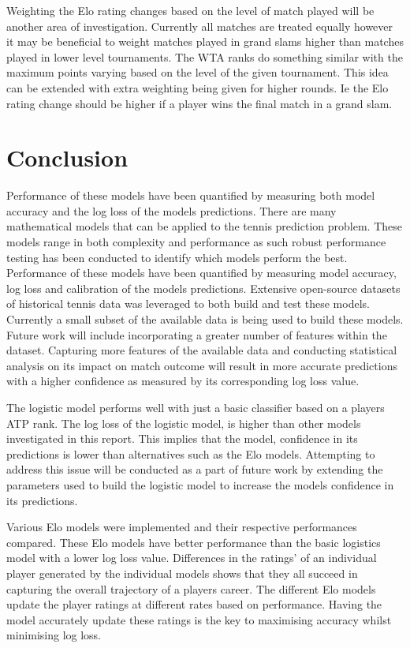 \documentclass[12pt,a4paper]{article}
\begin{document}
Weighting the Elo rating changes based on the level of match played will be another area of
investigation. Currently all matches are treated equally however it may be beneficial to weight
matches played in grand slams higher than matches played in lower level tournaments. The WTA ranks
do something similar with the maximum points varying based on the level of the given tournament.
This idea can be extended with extra weighting being given for higher rounds. Ie the Elo rating
change should be higher if a player wins the final match in a grand slam.
\clearpage

\section{Conclusion}
Performance of these models have been quantified by measuring both
model accuracy and the log loss of the models predictions. There are many mathematical models that can be applied to the tennis prediction problem.
These models range in both complexity and performance as such robust performance testing
has been conducted to identify which models perform the best. Performance of these models
have been quantified by measuring model accuracy, log loss and calibration of the models
predictions. Extensive open-source datasets of historical tennis data was leveraged to
both build and test these models. Currently a small subset of the available data is being
used to build these models. Future work will include incorporating a greater number of
features within the dataset. Capturing more features of the available data and conducting
statistical analysis on its impact on match outcome will result in more accurate predictions
with a higher confidence as measured by its corresponding log loss value.

The logistic model performs well with just a basic classifier based on a
players ATP rank. The log loss of the logistic model, is higher than other models
investigated in this report. This implies that the model,
confidence in its predictions is lower than alternatives such as the Elo models.
Attempting to address this issue will be conducted as a part of future work by
extending the parameters used to build the logistic model to increase the models
confidence in its predictions.

Various Elo models were implemented and their respective performances compared. These Elo
models have better performance than the basic logistics model with a
lower log loss value. Differences in the ratings' of an individual player
generated by the individual models shows that they all succeed in capturing the overall
trajectory of a players career. The different Elo models update the player ratings at
different rates based on performance. Having the model accurately update these ratings
is the key to maximising accuracy whilst minimising log loss.

\clearpage




\vspace{10mm}
\noindent \hrulefill
\end{document}
